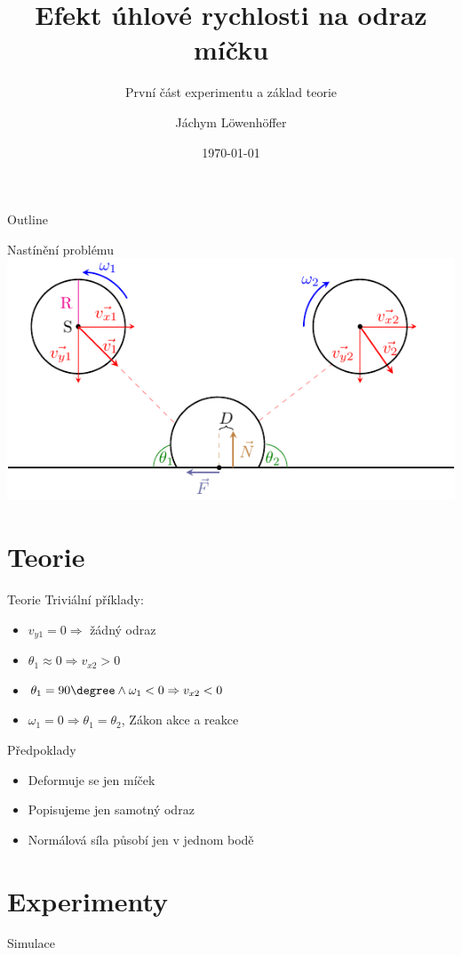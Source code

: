 \documentclass{beamer}
\title{Efekt úhlové rychlosti na odraz míčku}
\subtitle{První část experimentu a základ teorie}
\author{Jáchym Löwenhöffer}
\institute{GEVO JM}
\date{\today}
\begin{document}
 
 \begin{frame}
  \titlepage
 \end{frame}

 \begin{frame}{Outline}
  \tableofcontents
 \end{frame}

 \begin{frame}{Nastínění problému}
  \includegraphics{diagram.pdf}
 \end{frame}

 \section{Teorie} 

\begin{frame}
 \sectionpage
\end{frame}

 \begin{frame}{Teorie}
  Triviální příklady:
  \begin{itemize}
   \item $v_{y1}=0 \Rightarrow $ žádný odraz
   \item $\theta_1\approx0 \Rightarrow v_{x2} > 0$
   \item $\theta_1=90\degree \land \omega_1<0 \Rightarrow v_{x2} < 0 $
   \item $\omega_1=0 \Rightarrow \theta_1=\theta_2 $, Zákon akce a reakce
  \end{itemize}
 \end{frame}

 \begin{frame}{Předpoklady}
 \begin{itemize}
  \item Deformuje se jen míček
  \item Popisujeme jen samotný odraz
  \item Normálová síla působí jen v jednom bodě
 \end{itemize}
\end{frame}

\section{Experimenty}
\begin{frame}
 \sectionpage
\end{frame}

 \begin{frame}{Simulace}
 
\end{frame}
\end{document}
